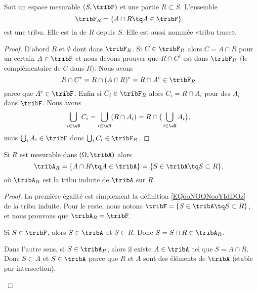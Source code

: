 \begin{propositionDef}      \label{DefDHTTooWNoKDP}
	Soit un espace mesurable \( (S,\tribF)  \) et une partie \( R\subset S\). L'ensemble
	\begin{equation}        \label{EQooNOQNooYIdDOz}
		\tribF_R=\{ A\cap R\tq A\in\tribF \}
	\end{equation}
	est une tribu. Elle est la  de \( R\) depuis \( S\). Elle est aussi nommée «tribu trace».
\end{propositionDef}

\begin{proof}
	D'abord \( R\) et \( \emptyset\) dont dans \( \tribF_R\). Si \( C\in\tribF_R \) alors \( C=A\cap R\) pour un certain \( A\in \tribF\) et nous devons prouver que \( R\cap C^c\) est dans \( \tribF_R\) (le complémentaire de \( C\) dans \( R\)). Nous avons
	\begin{equation}
		R\cap C^c=R\cap(A\cap R)^c=R\cap A^c\in \tribF_R
	\end{equation}
	parce que \( A^c\in \tribF\). Enfin si \( C_i\in \tribF_R\) alors \( C_i=R\cap A_i\) pour des \( A_i\) dans \( \tribF\). Nous avons
	\begin{equation}
		\bigcup_{i\in \eN}C_i=\bigcup_{i\in \eN}(R\cap A_i)=R\cap\big( \bigcup_{i\in \eN}A_i \big),
	\end{equation}
	mais \( \bigcup_iA_i \in \tribF\) donc \( \bigcup_iC_i\in \tribF_R\).
\end{proof}

\begin{proposition}     \label{PROPooUNNSooMUQKfp}
	Si \( R\) est mesurable dans \( (\Omega,\tribA)\) alors
	\begin{equation}
		\tribA_R=\{ A\cap R\tq A\in\tribA \}=\{ S\in\tribA\tq S\subset R \},
	\end{equation}
	où \( \tribA_R\) est la tribu induite de \( \tribA\) sur \( R\).
\end{proposition}

\begin{proof}
	La première égalité est simplement la définition \eqref{EQooNOQNooYIdDOz} de la tribu induite.
	Pour le reste, nous notons \( \tribF=\{ S\in \tribA\tq S\subset R \}\), et nous prouvons que \( \tribA_R=\tribF \).

	\begin{subproof}
		Si \( S\in \tribF\), alors \( S\in \tribA\) et \( S\subset R\). Donc \( S=S\cap R\in\tribA_R\).

		Dans l'autre sens, si \( S\in \tribA_R\), alors il existe \( A\in\tribA\) tel que \( S=A\cap R\). Donc \( S\subset A\) et \( S\in\tribA\) parce que \( R\) et \( A\) sont des éléments de \( \tribA\) (stable par intersection).
	\end{subproof}
\end{proof}


